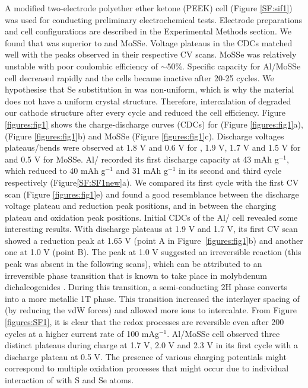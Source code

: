 A modified two-electrode polyether ether ketone (PEEK) cell (Figure \ref{SF:sif1}) was used for conducting preliminary electrochemical tests. Electrode preparations and cell configurations are described in the Experimental Methods section. We found that  was superior to  and MoSSe. Voltage plateaus in the CDCs matched well with the peaks observed in their respective CV scans. MoSSe was relatively unstable with poor coulombic efficiency of $\sim$50\%. Specific capacity for Al/MoSSe cell decreased rapidly and the cells became inactive after 20-25 cycles. We hypothesise that Se substitution in  was non-uniform, which is why the material does not have a uniform crystal structure. Therefore, intercalation of  degraded our cathode structure after every cycle and reduced the cell efficiency.
Figure \ref{figures:fig1} shows the charge-discharge curves (CDCs) for  (Figure \ref{figures:fig1}a),  (Figure \ref{figures:fig1}b) and MoSSe (Figure \ref{figures:fig1}c). Discharge voltages plateaus/bends  were observed at 1.8 V and 0.6 V  for , 1.9 V, 1.7 V  and 1.5 V for  and 0.5 V for MoSSe. Al/  recorded its first discharge capacity at 43 mAh g$^{-1}$, which reduced to 40 mAh g$^{-1}$ and 31 mAh g$^{-1}$ in its second and third cycle respectively (Figure\ref{SF:SF1new}a). We compared its first cycle with the first CV scan (Figure \ref{figures:fig1}e) and found a good resemblance between the discharge voltage plateau and reduction peak positions, and in between the charging plateau and oxidation peak positions. Initial CDCs of the Al/ cell revealed some interesting results. With discharge plateaus at 1.9 V and 1.7 V, its first CV scan showed a reduction peak at 1.65 V (point A in Figure\ \ref{figures:fig1}b) and another one at 1.0 V (point B). The peak at 1.0 V suggested an irreversible reaction (this peak was absent in the following scans), which can be attributed to an irreversible phase transition that is known to take place in molybdenum dichalcogenides \cite{fan_hybrid_2017}. During this transition, a semi-conducting 2H phase converts into a more metallic 1T phase.  This transition increased the interlayer spacing of  (by reducing the vdW forces) and allowed more  ions to intercalate. From Figure \ref{figures:SF1}, it is clear that the redox processes are reversible even after 200 cycles  at a higher current rate of 100 mAg$^{-1}$. Al/MoSSe cell observed three distinct plateaus during charge at 1.7 V, 2.0 V and 2.3 V in its first cycle with a discharge plateau at 0.5 V. The presence of various charging potentials might correspond to multiple oxidation processes that might occur due to individual interaction of  with S and Se atoms. 
